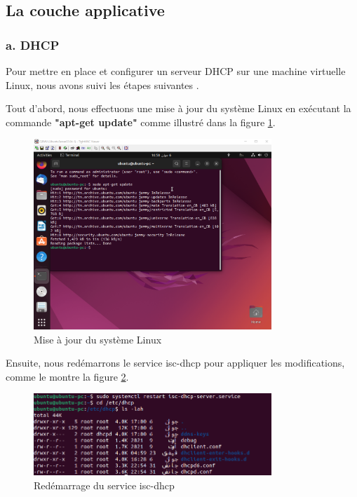 \subsection{La couche applicative}

\subsubsection{a. DHCP}

Pour mettre en place et configurer un serveur DHCP sur une machine virtuelle Linux, nous avons suivi les étapes suivantes \cite{linuxhint_dhcp_server}.

Tout d'abord, nous effectuons une mise à jour du système Linux en exécutant la commande \textbf{"apt-get update"} comme illustré dans la figure \ref{fig:update-linux}.

\begin{figure}[H]
    \centering
    \includegraphics[width=0.8\textwidth]{Images/dhcp1.png}
    \caption{Mise à jour du système Linux}
    \label{fig:update-linux}
\end{figure}

Ensuite, nous redémarrons le service isc-dhcp pour appliquer les modifications, comme le montre la figure \ref{fig:restart-isc-dhcp}.

\begin{figure}[H]
    \centering
    \includegraphics[width=0.8\textwidth]{Images/dhcp2.png}
    \caption{Redémarrage du service isc-dhcp}
    \label{fig:restart-isc-dhcp}
\end{figure}

